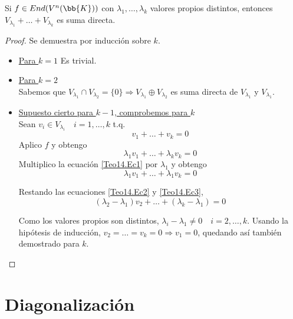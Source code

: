\begin{teo}
    Si $f\in End(V^n(\bb{K}))$ con $\lambda_1, \dots, \lambda_k$ valores propios distintos, entonces $V_{\lambda_1}+\dots + V_{\lambda_k}$ es suma directa.
\end{teo}
\begin{proof}
    Se demuestra por inducción sobre $k$.
    \begin{itemize}
        \item \underline{Para $k=1$} Es trivial.
        \item \underline{Para $k=2$}\\
        Sabemos que $V_{\lambda_1}\cap V_{\lambda_2}=\{0\} \Longrightarrow V_{\lambda_1} \oplus V_{\lambda_2}$ es suma directa de $V_{\lambda_1}$ y $V_{\lambda_1}$.

        \item \underline{Supuesto cierto para $k-1$, comprobemos para $k$}\\
        Sean $v_i \in V_{\lambda_i}\quad i=1, \dots, k$ t.q.
        \begin{equation} \label{Teo14.Ec1}
            v_1 + \dots + v_k = 0
        \end{equation}
        Aplico $f$ y obtengo 
        \begin{equation} \label{Teo14.Ec2}
            \lambda_1v_1 + \dots + \lambda_kv_k = 0
        \end{equation}
        Multiplico la ecuación \ref{Teo14.Ec1} por $\lambda_1$ y obtengo 
        \begin{equation} \label{Teo14.Ec3}
            \lambda_1v_1 + \dots + \lambda_1v_k = 0
        \end{equation}

        Restando las ecuaciones \ref{Teo14.Ec2} y \ref{Teo14.Ec3},
        \begin{equation*}
            (\lambda_2-\lambda_1)v_2 + \dots + (\lambda_k-\lambda_1) = 0
        \end{equation*}

        Como los valores propios son distintos, $\lambda_i-\lambda_1 \neq 0 \quad i=2,\dots,k$. Usando la hipótesis de inducción, $v_2 = \dots = v_k = 0 \Longrightarrow v_1 = 0$, quedando así también demostrado para $k$.
    \end{itemize}
\end{proof}


\section{Diagonalización}

